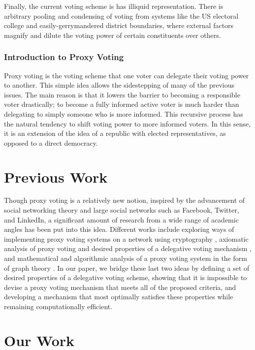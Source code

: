 \documentclass[10pt]{article}
\theoremstyle{definition}
\begin{document}
Finally, the current voting scheme is has illiquid representation. There is arbitrary pooling and condensing of voting from systems like the US electoral college and easily-gerrymandered district boundaries, where external factors magnify and dilute the voting power of certain constituents over others.

\subsubsection{Introduction to Proxy Voting}

Proxy voting is the voting scheme that one voter can delegate their voting power to another. This simple idea allows the sidestepping of many of the previous issues. The main reason is that it lowers the barrier to becoming a responsible voter drastically; to become a fully informed active voter is much harder than delegating to simply someone who is more informed. This recursive process has the natural tendency to shift voting power to more informed voters. In this sense, it is an extension of the idea of a republic with elected representatives, as opposed to a direct democracy.

\section{Previous Work}

Though proxy voting is a relatively new notion, inspired by the advancement of social networking theory and large social networks such as Facebook, Twitter, and LinkedIn, a significant amount of research from a wide range of academic angles has been put into this idea. Different works include exploring ways of implementing proxy voting systems on a network using cryptography \cite{ben1}, axiomatic analysis of proxy voting and desired properties of a delegative voting mechanism \cite{ben2}, and mathematical and algorithmic analysis of a proxy voting system in the form of graph theory \cite{ben3}. In our paper, we bridge these last two ideas by defining a set of desired properties of a delegative voting scheme, showing that it is impossible to devise a proxy voting mechanism that meets all of the proposed criteria, and developing a mechanism that most optimally satisfies these properties while remaining computationally efficient.


\section{Our Work}
\end{document}

